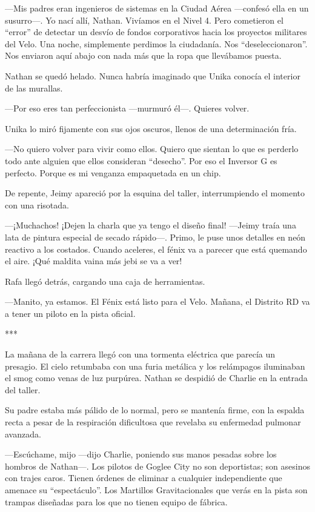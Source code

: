 \documentclass[11pt,twoside]{book}
\begin{document}
---Mis padres eran ingenieros de sistemas en la Ciudad Aérea ---confesó ella en un susurro---. Yo nací allí, Nathan. Vivíamos en el Nivel 4. Pero cometieron el ``error'' de detectar un desvío de fondos corporativos hacia los proyectos militares del Velo. Una noche, simplemente perdimos la ciudadanía. Nos ``deseleccionaron''. Nos enviaron aquí abajo con nada más que la ropa que llevábamos puesta.

Nathan se quedó helado. Nunca habría imaginado que Unika conocía el interior de las murallas.

---Por eso eres tan perfeccionista ---murmuró él---. Quieres volver.

Unika lo miró fijamente con sus ojos oscuros, llenos de una determinación fría.

---No quiero volver para vivir como ellos. Quiero que sientan lo que es perderlo todo ante alguien que ellos consideran ``desecho''. Por eso el Inversor G es perfecto. Porque es mi venganza empaquetada en un chip.

De repente, Jeimy apareció por la esquina del taller, interrumpiendo el momento con una risotada.

---¡Muchachos! ¡Dejen la charla que ya tengo el diseño final! ---Jeimy traía una lata de pintura especial de secado rápido---. Primo, le puse unos detalles en neón reactivo a los costados. Cuando aceleres, el fénix va a parecer que está quemando el aire. ¡Qué maldita vaina más jebi se va a ver!

Rafa llegó detrás, cargando una caja de herramientas.

---Manito, ya estamos. El Fénix está listo para el Velo. Mañana, el Distrito RD va a tener un piloto en la pista oficial.

\bigskip
\begin{center}***\end{center}
\bigskip

La mañana de la carrera llegó con una tormenta eléctrica que parecía un presagio. El cielo retumbaba con una furia metálica y los relámpagos iluminaban el smog como venas de luz purpúrea. Nathan se despidió de Charlie en la entrada del taller. 

Su padre estaba más pálido de lo normal, pero se mantenía firme, con la espalda recta a pesar de la respiración dificultosa que revelaba su enfermedad pulmonar avanzada.

---Escúchame, mijo ---dijo Charlie, poniendo sus manos pesadas sobre los hombros de Nathan---. Los pilotos de Goglee City no son deportistas; son asesinos con trajes caros. Tienen órdenes de eliminar a cualquier independiente que amenace su ``espectáculo''. Los Martillos Gravitacionales que verás en la pista son trampas diseñadas para los que no tienen equipo de fábrica.
\end{document}
